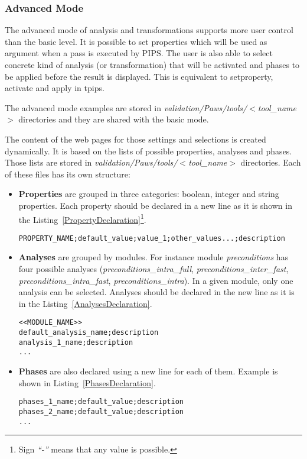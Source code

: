 \subsubsection{Advanced Mode}

The advanced mode of analysis and transformations supports more user
control than the basic level. It is possible to set properties which
will be used as argument when a pass is executed by PIPS. The user is
also able to select concrete kind of analysis (or transformation) that
will be activated and phases to be applied before the result is
displayed. This is equivalent to setproperty, activate and apply in
tpips.

The advanced mode examples are stored in \emph{validation/Paws/tools/$<$tool\_name$>$} directories and they are shared with the basic mode.

The content of the web pages for those settings and selections is
created dynamically. It is based on the lists of possible properties,
analyses and phases. Those lists are stored in
\emph{validation/Paws/tools/$<$tool\_name$>$} directories. Each of
these files has its own structure:

\begin{itemize}

\item {\bf Properties} are grouped in three categories: boolean,
  integer and string properties. Each property should be declared in a
  new line as it is shown in the
  Listing~\ref{PropertyDeclaration}\footnote{Sign \emph{``-''} means
    that any value is possible.}.
  
\begin{lstlisting}
PROPERTY_NAME;default_value;value_1;other_values...;description
\end{lstlisting}

\item {\bf Analyses} are grouped by modules. For instance module
  \emph{preconditions} has four possible analyses
  (\emph{preconditions\_intra\_full},
  \emph{preconditions\_inter\_fast},
  \emph{preconditions\_intra\_fast}, \emph{preconditions\_intra}). In
  a given module, only one analysis can be selected. Analyses should
  be declared in the new line as it is in the Listing~\ref{AnalysesDeclaration}.
  
\begin{lstlisting}
<<MODULE_NAME>>
default_analysis_name;description
analysis_1_name;description
...
\end{lstlisting}
  
\item {\bf Phases} are also declared using a new line for each of
  them. Example is shown in Listing~\ref{PhasesDeclaration}.
  
\begin{lstlisting}
phases_1_name;default_value;description
phases_2_name;default_value;description
...
\end{lstlisting}

\end{itemize}

